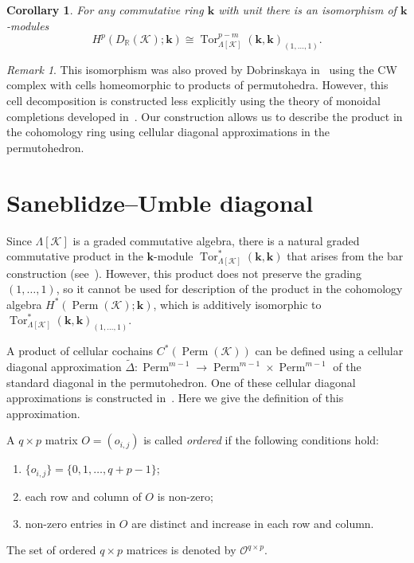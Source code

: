 \documentclass[a4paper,12pt]{amsart}
\newcommand{\K}{\mathcal K}
\newcommand{\RR}{\mathbb R}
\newcommand{\kk}{\mathbf{k}}
\newtheorem{corollary}[formula]{Corollary}
\theoremstyle{definition}
\theoremstyle{remark}
\newtheorem*{remark}{Remark}
\numberwithin{equation}{section}
\DeclareMathOperator{\Perm}{Perm}
\DeclareMathOperator{\Tor}{Tor}
\begin{document}
\begin{corollary}
For any commutative ring $\kk$ with unit there is an isomorphism of $\kk$-modules
$$H^p(D_\RR(\K); \kk) \cong \Tor^{p-m}_{\Lambda[\K]}(\kk, \kk)_{ ( 1, \ldots, 1) }.$$
\end{corollary}

\begin{remark}
This isomorphism was also proved by Dobrinskaya in~\cite{Dobr09} using the CW complex with cells homeomorphic to products of permutohedra. 
However, this cell decomposition is constructed less explicitly using the theory of monoidal completions developed in~\cite{Dobr06}.
Our construction allows us to describe the product in the cohomology ring using cellular diagonal approximations in the permutohedron.
\end{remark}



\section{Saneblidze--Umble diagonal}
Since $\Lambda[\K]$ is a graded commutative algebra,
there is a natural graded commutative product in the $\kk$-module $\Tor_{\Lambda[\K]}^*(\kk, \kk)$ that arises from the bar construction (see~\cite[Chapter~X]{Mac}).
However, this product does not preserve the grading $(1, \ldots, 1 )$, 
so it cannot be used for description of the product in the cohomology algebra $H^*(\Perm(\K); \kk)$, which is additively isomorphic to $\Tor_{\Lambda[\K]}^*(\kk, \kk)_{(1, \ldots, 1 )}$. 

A product of cellular cochains $C^*(\Perm(\K))$ can be defined using a cellular diagonal approximation $\widetilde{\Delta} \colon \Perm^{m-1} \to \Perm^{m-1} \times \Perm^{m-1}$ of the standard diagonal in the permutohedron.
One of these cellular diagonal approximations is constructed in~\cite{SU}.
Here we give the definition of this approximation.

A $q \times p$ matrix $O = (o_{i,j})$ is called \textit{ordered} if the following conditions hold:
\begin{enumerate}
\item[(1)] $\{o_{i,j}\} = \{0, 1, \ldots, q+p-1 \}$;
\item[(2)] each row and column of $O$ is non-zero;
\item[(3)] non-zero entries in $O$ are distinct and increase in each row and column.
\end{enumerate}
The set of ordered $q\times p$ matrices is denoted by $\mathcal{O}^{q \times p}$.
\end{document}
